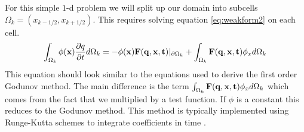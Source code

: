 \documentclass[10]{amsart}
\begin{document}
 For this simple $1$-d problem we will split up our domain into subcells $\Omega_k=(x_{k-1/2},x_{k+1/2})$. This
 requires solving equation \eqref{eq:weakform2} on each cell.
%  
%  
%  
 \begin{equation}
\int_{\Omega_k} \phi({\bf x}) \frac{\partial q}{\partial t} d\Omega_k =-\phi({\bf x}) {\bf F(q,x,t)} |_{\partial \Omega_k}
 +\int_{\Omega_k}{\bf F(q,x,t)} \phi_x d\Omega_k \label{eq:weakform2}
 \end{equation}
 This equation should look similar to the equations used to derive the first order Godunov method. The main difference
 is the term $\int_{\Omega_k}{\bf F(q,x,t)}\phi_x d\Omega_k$ which comes from the fact that we multiplied by a
 test function. If $\phi$ is a constant this reduces to the Godunov method.
 This method is typically implemented using Runge-Kutta schemes to integrate coefficients
 in time \cite{cockburn1998runge}.
\end{document}
